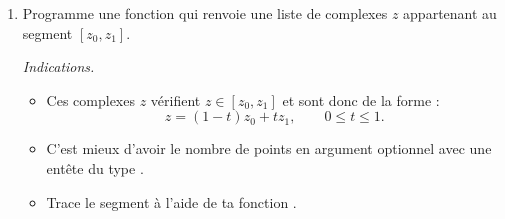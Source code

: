 \documentclass[11pt,class=report,crop=false]{standalone}
\begin{document}
\begin{activite}
\begin{enumerate}
   
   \item Programme une fonction 
  qui renvoie une liste de complexes $z$ appartenant au segment $[z_0,z_1]$.
  
  \emph{Indications.}
  \begin{itemize} 
    \item Ces complexes $z$ vérifient $z \in[z_0,z_1]$ et sont donc de la forme :
    $$z = (1-t)z_0 + tz_1, \qquad 0 \le t \le 1.$$
    \item C'est mieux d'avoir le nombre de points en argument optionnel avec une entête du type .
    
    \item Trace le segment à l'aide de ta fonction .
   \end{itemize}   
   
\end{enumerate} 
\end{activite}


\end{document}
